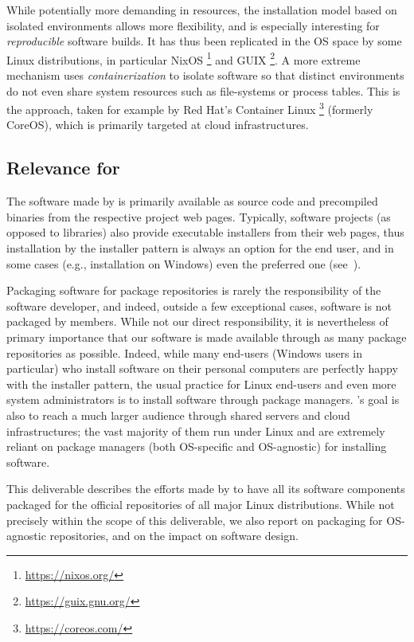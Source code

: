 \documentclass{deliverablereport}
\begin{document}
While potentially more demanding in resources, the installation model
based on isolated environments allows more flexibility, and is
especially interesting for \emph{reproducible} software builds. %
It has thus been replicated in the OS space by some Linux
distributions, in particular NixOS%
\footnote{\url{https://nixos.org/}} %
and GUIX%
\footnote{\url{https://guix.gnu.org/}}. %
A more extreme mechanism uses \emph{containerization} to isolate
software so that distinct environments do not even share system
resources such as file-systems or process tables. %
This is the approach, taken for example by Red Hat's Container Linux%
\footnote{\url{https://coreos.com/}} %
(formerly CoreOS), which is primarily targeted at cloud infrastructures.

\subsection{Relevance for \ODK}

The software made by \ODK is primarily available as source code and
precompiled binaries from the respective project web pages. %
Typically, software projects (as opposed to libraries) also provide
executable installers from their web pages, thus installation by the
installer pattern is always an option for the end user, and in some
cases (e.g., installation on Windows) even the preferred one
(see~).

Packaging software for package repositories is rarely the
responsibility of the software developer, and indeed, outside a few
exceptional cases, \ODK software is not packaged by \ODK members. %
While not our direct responsibility, it is nevertheless of
primary importance that our software is made available through as many
package repositories as possible. %
Indeed, while many end-users (Windows users in particular) who install
software on their personal computers are perfectly happy with the
installer pattern,
the usual practice for Linux end-users and even more system
administrators is to install
software through package managers. \ODK's goal is also to reach a much larger
audience through shared servers and cloud infrastructures; the vast majority of them
run under Linux and are extremely reliant on package managers
(both OS-specific and OS-agnostic) for installing software.


This deliverable describes the efforts made by \ODK to have all its
software components packaged for the official repositories of all
major Linux distributions. %
While not precisely within the scope of this deliverable, we also
report on packaging for OS-agnostic repositories, and on the impact on
software design.
\end{document}
